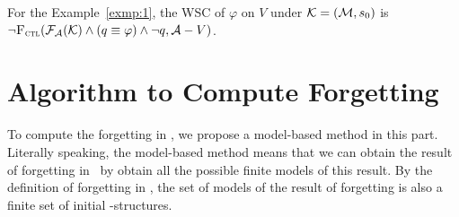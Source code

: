 \documentclass{article}
\begin{document}
%
%

\begin{example}
For the Example~\ref{exmp:1}, the WSC of $\varphi$ on $V$ under ${\cal K} =({\cal M}, s_0)$ is $\neg {\textsc{F}_{\textsc{ctl}}}({\cal F}_{{\cal A}}({\cal K}) \wedge (q \equiv \varphi) \wedge \neg q, {\cal A} - V)$.
\end{example}


\section{Algorithm to Compute Forgetting}
To compute the forgetting in \CTL, we propose a model-based method in this part.
Literally speaking, the model-based method means that we can obtain the result of forgetting in \CTL\ by obtain all the possible finite models of this result.
By the definition of forgetting in \CTL, the set of models of the result of forgetting is also a finite set of initial \MPK-structures.
%
%
\end{document}
